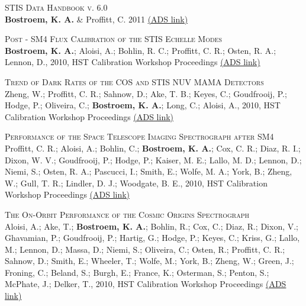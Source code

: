 \begin{revnumerate}[24]
\item{\textsc{STIS Data Handbook v. 6.0}\\
{\bf Bostroem, K. A.} \& Proffitt, C. 2011
\color{blue}\href{https://ui.adsabs.harvard.edu/abs/2011stis.book.....B/abstract}{(ADS link)}\color{black}}\\

\item{\textsc{Post - SM4 Flux Calibration of the STIS Echelle Modes}\\
\textbf{Bostroem, K. A.}; Aloisi, A.; Bohlin, R. C.; Proffitt, C. R.; Osten, R. A.; Lennon, D., 2010, HST Calibration Workshop Proceedings
\color{blue}\href{https://ui.adsabs.harvard.edu/abs/2010hstc.workE..51B/abstract}{(ADS link)}\color{black}}\\%

\item{\textsc{Trend of Dark Rates of the COS and STIS NUV MAMA Detectors}\\
Zheng, W.; Proffitt, C. R.; Sahnow, D.; Ake, T. B.; Keyes, C.; Goudfrooij, P.; Hodge, P.; Oliveira, C.; \textbf{Bostroem, K. A.}; Long, C.; Aloisi, A., 2010, HST Calibration Workshop Proceedings 
\color{blue}\href{https://ui.adsabs.harvard.edu/abs/2010hstc.workE..47Z/abstract}{(ADS link)}\color{black}}\\

\item{\textsc{Performance of the Space Telescope Imaging Spectrograph after SM4}\\
Proffitt, C. R.; Aloisi, A.; Bohlin, C.; \textbf{Bostroem, K. A.}; Cox, C. R.; Diaz, R. I.; Dixon, W. V.; Goudfrooij, P.; Hodge, P.; Kaiser, M. E.; Lallo, M. D.; Lennon, D.; Niemi, S.; Osten, R. A.; Pascucci, I.; Smith, E.; Wolfe, M. A.; York, B.; Zheng, W.; Gull, T. R.; Lindler, D. J.; Woodgate, B. E., 2010, HST Calibration Workshop Proceedings
\color{blue}\href{https://ui.adsabs.harvard.edu/abs/2010hstc.workE...6P/abstract}{(ADS link)}\color{black}}\\
\item{\textsc{The On-Orbit Performance of the Cosmic Origins Spectrograph}\\
Aloisi, A.; Ake, T.; \textbf{Bostroem, K. A.}; Bohlin, R.; Cox, C.; Diaz, R.; Dixon, V.; Ghavamian, P.; Goudfrooij, P.; Hartig, G.; Hodge, P.; Keyes, C.; Kriss, G.; Lallo, M.; Lennon, D.; Massa, D.; Niemi, S.; Oliveira, C.; Osten, R.; Proffitt, C. R.; Sahnow, D.; Smith, E.; Wheeler, T.; Wolfe, M.; York, B.; Zheng, W.; Green, J.; Froning, C.; Beland, S.; Burgh, E.; France, K.; Osterman, S.; Penton, S.; McPhate, J.; Delker, T., 2010, HST Calibration Workshop Proceedings 
\color{blue}\href{https://ui.adsabs.harvard.edu/abs/2010hstc.workE...3A/abstract}{(ADS link)}\color{black}}\\
\end{revnumerate}
